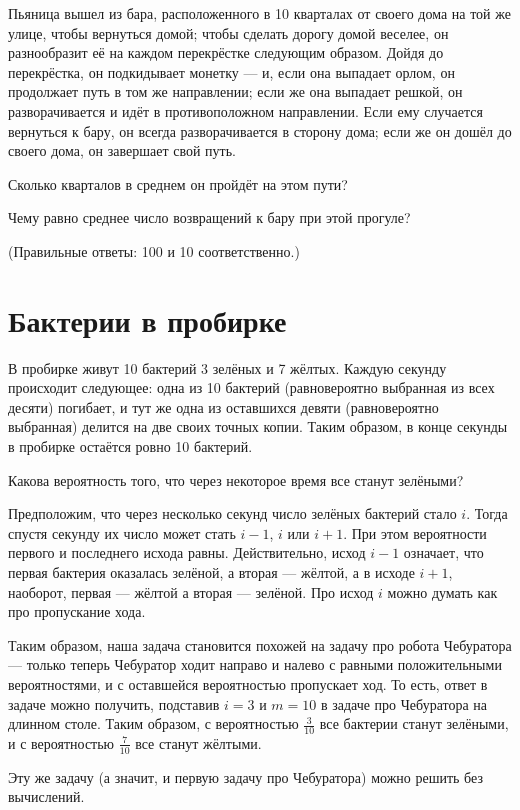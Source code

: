 \documentclass{article}
\begin{document}
Пьяница вышел из бара, расположенного в 10 кварталах от своего дома на той же улице, чтобы вернуться домой; 
чтобы сделать дорогу домой веселее, он разнообразит её на каждом перекрёстке следующим образом. 
Дойдя до перекрёстка, он подкидывает монетку --- и, если она выпадает орлом, он продолжает путь в том же направлении; если же она выпадает решкой, он разворачивается и идёт в противоположном направлении. 
Если ему случается вернуться к бару, он всегда разворачивается в сторону дома; если же он дошёл до своего дома, он завершает свой путь. 

Сколько кварталов в среднем он пройдёт на этом пути?

Чему равно среднее число возвращений к бару при этой прогуле?

(Правильные ответы: 100 и 10 соответственно.)


\section{Бактерии в пробирке}

В пробирке живут 10 бактерий 3 зелёных и 7 жёлтых.
Каждую секунду происходит следующее: одна из 10 бактерий (равновероятно выбранная из всех десяти) погибает,
и тут же одна из оставшихся девяти (равновероятно выбранная)
 делится на две своих точных копии.
Таким образом,
в конце секунды в пробирке остаётся ровно 10 бактерий.

Какова вероятность того, что через некоторое время все станут зелёными?


Предположим, что через несколько секунд 
число зелёных бактерий стало $i$.
Тогда спустя секунду их число может стать $i-1$, $i$ или $i+1$.
При этом вероятности первого и последнего исхода равны.
Действительно, исход $i-1$ означает, 
что первая бактерия оказалась зелёной, а вторая --- жёлтой,
а в исходе $i+1$,
наоборот, первая --- жёлтой а вторая --- зелёной.
Про исход $i$ можно думать как про пропускание хода.

Таким образом, наша задача становится похожей на задачу про робота Чебуратора --- только теперь Чебуратор ходит направо и налево с равными положительными вероятностями, и с оставшейся вероятностью пропускает ход.
То есть, ответ в задаче можно получить, подставив $i=3$ и $m=10$ в задаче про Чебуратора на длинном столе.
Таким образом, с вероятностью $\tfrac{3}{10}$ все бактерии станут зелёными, 
и с вероятностью $\tfrac{7}{10}$ все станут жёлтыми.

\medskip

Эту же задачу (а значит, и первую задачу про Чебуратора)
можно решить без вычислений.
\end{document}
